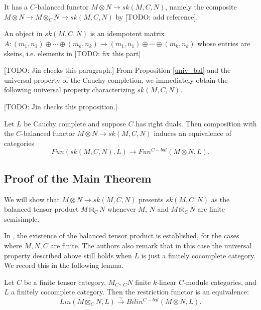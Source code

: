 \noindent It has a $C$-balanced functor $M\otimes N \to sk(M,C,N)$, namely the
composite $M\otimes N\to M\otimes_C N\to sk(M,C,N)$ by [TODO: add reference].

\begin{remark}
An object in $sk(M,C,N)$ is an idempotent matrix $A:(m_1,n_1)\oplus\cdots\oplus (m_k,n_k)\to (m_1,n_1)\oplus\cdots\oplus (m_k,n_k)$ whose entries are skeins, i.e. elements in [TODO: fix this part]\end{remark}


[TODO: Jin checks this paragraph.] From Proposition \ref{univ_bal} and the universal property of the Cauchy
completion, we immediately obtain the following universal property
characterizing $sk(M,C,N)$.

[TODO: Jin checks this proposition.]
\begin{proposition}\label{univ_sk}
  Let $L$ be Cauchy complete and suppose $C$ has right duals. Then composition
  with the $C$-balanced functor $M\otimes N\to sk(M,C,N)$ induces an
  equivalence of categories $$Fun(sk(M,C,N),L)\to Fun^{C-bal}(M\otimes N,L).$$
\end{proposition}


\subsection{Proof of the Main Theorem}

We will show that $M\otimes N\to sk(M,C,N)$ presents
$sk(M,C,N)$ as the balanced tensor product $M\boxtimes_C N$ whenever $M$, $N$
and $M\boxtimes_C N$ are finite semisimple.

In \cite{douglas/balanced-product}, the existence of the balanced tensor
product is established, for the cases where $M,N,C$ are finite. The authors also remark that
in this case the universal property described above still holds when $L$ is
just a finitely cocomplete category. We record this in the following lemma.

\begin{lemma}\label{univ_box}
  Let $C$ be a finite tensor category, $M_C$, $_{C}N$ finite $k$-linear $C$-module
  categories, and $L$ a finitely cocomplete category. Then the restriction
  functor is an equivalence: \[Lin(M \boxtimes_{C} N, L) \xrightarrow{\sim} Bilin^{C-bal}(M \otimes N, L).\]
\end{lemma}

